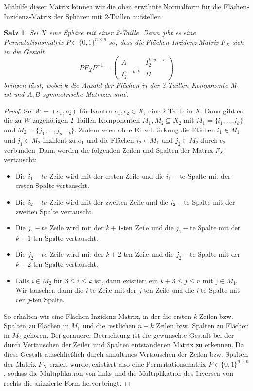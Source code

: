 \documentclass[12pt,titlepage,twoside,cleardoublepage]{article}
\theoremstyle{nummermitklammern}
\newtheorem{satz}[temp]{Satz}
\newtheorem{satz}[zahl]{Satz}
\numberwithin{equation}{section}
\begin{document}
Mithilfe dieser Matrix können wir die oben erwähnte Normalform für die Flächen-Inzidenz-Matrix der Sphären mit 2-Taillen aufstellen.
\begin{satz}\label{mat2w}
Sei $X$ eine Sphäre mit einer 2-Taille. Dann gibt es eine Permutationsmatrix $P\in \{0,1\}^{n\times n}$ so, dass die Flächen-Inzidenz-Matrix $F_X$ sich in die Gestalt 
\[
PF_XP^{-1}=
\left( 
\begin{array}{c|c} 
  A & I^{k,n-k}_2 \\ 
  \hline 
  I^{n-k,k}_2 & B 
\end{array} 
\right)
\] 
bringen lässt, wobei $k$ die Anzahl der Flächen in der 2-Taillen Komponente $M_1$ ist und $A,B$ symmetrische Matrizen sind.
\end{satz}
\begin{proof}
Sei $W=(e_1,e_2)$ für Kanten $e_1,e_2\in X_1$ eine 2-Taille in $X.$ Dann gibt es die zu $W$ zugehörigen 2-Taillen Komponenten $M_1,M_2\subseteq X_2$ mit $M_1=\{i_1,\ldots,i_k\}$ und $M_2=\{j_1,\ldots,j_{n-k}\}$. Zudem seien ohne Einschränkung die Flächen $i_1\in M_1$ und $j_1\in M_2$ inzident zu $e_1$ und die Flächen $i_2\in M_1$ und $j_2\in M_2$ durch $e_2$ verbunden. Dann werden die folgenden Zeilen und Spalten der Matrix $F_X$ vertauscht:
\begin{itemize}
\item Die $i_1-te$ Zeile wird mit der ersten Zeile und die  $i_1-$te Spalte mit der ersten Spalte vertauscht.
\item Die $i_2-te$ Zeile wird mit der zweiten Zeile und die $i_2-$te Spalte mit der zweiten Spalte vertauscht.
\item Die $j_1-te$ Zeile wird mit der $k+1$-ten Zeile und die $j_1-$te Spalte mit der $k+1$-ten Spalte vertauscht.
\item Die $j_2-te$ Zeile wird mit der $k+2$-ten Zeile und die $j_2-$te Spalte mit der $k+2$-ten Spalte vertauscht.
\item Falls $i\in M_2$ für $3\leq i \leq k$ ist, dann existiert ein $k+3\leq j\leq n$ mit $j \in M_1.$ 
Wir tauschen dann die $i$-te Zeile mit der $j$-ten Zeile und die $i$-te Spalte mit der $j$-ten Spalte.
\end{itemize} 
So erhalten wir eine Flächen-Inzidenz-Matrix, in der die ersten $k$ Zeilen bzw. Spalten zu Flächen in $M_1$ und die restlichen $n-k$ Zeilen bzw. Spalten zu Flächen in $M_2$  gehören. Bei genauerer Betrachtung ist die gewünschte Gestalt  bei der durch Vertauschen der Zeilen und Spalten entstandenen Matrix zu erkennen. Da diese Gestalt ausschließlich durch simultanes Vertauschen der Zeilen bzw. Spalten der Matrix $F_X$ erzielt wurde, existiert also eine Permutationsmatrix $P\in\{0,1\}^{n\times n}$, sodass die Multiplikation von links und die Multiplikation des Inversen von rechts  die skizzierte Form hervorbringt.
\end{proof}
\end{document}
